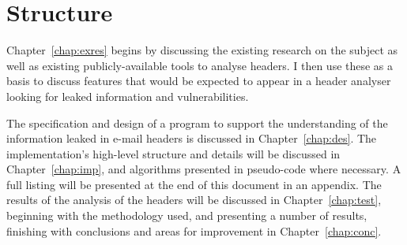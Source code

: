 \documentclass[a4paper,DIV=12,BCOR=7mm,abstract=yes,twoside,11pt]{scrreprt}
\begin{document}
\section{Structure}

Chapter~\ref{chap:exres} begins by discussing the existing research on
the subject as well as existing publicly-available tools to analyse
headers.  I then use these as a basis to discuss features that would be
expected to appear in a header analyser looking for leaked information
and vulnerabilities.

The specification and design of a program to support the understanding of the
information leaked in e-mail headers is discussed in Chapter~\ref{chap:des}.
The implementation's high-level structure and details will be discussed in
Chapter~\ref{chap:imp}, and algorithms presented in pseudo-code where
necessary.  A full listing will be presented at the end of this document in
an appendix. The results of the analysis of the headers will be discussed in
Chapter~\ref{chap:test}, beginning with the methodology used, and presenting
a number of results, finishing with conclusions and areas for improvement in
Chapter~\ref{chap:conc}.
\end{document}
